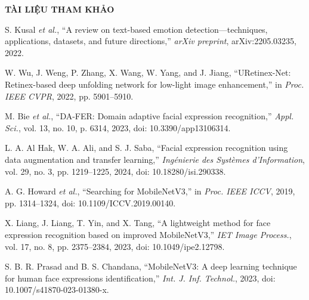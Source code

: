 {\LARGE \textbf{TÀI LIỆU THAM KHẢO}} \\[1cm] %

\begin{enumerate}[label={[{\arabic*}]}]
    \item S. Kusal \textit{et al.}, “A review on text-based emotion detection—techniques, applications, datasets, and future directions,” \textit{arXiv preprint}, arXiv:2205.03235, 2022.

    \item W. Wu, J. Weng, P. Zhang, X. Wang, W. Yang, and J. Jiang, “URetinex-Net: Retinex-based deep unfolding network for low-light image enhancement,” in \textit{Proc. IEEE CVPR}, 2022, pp. 5901–5910.

    \item M. Bie \textit{et al.}, “DA-FER: Domain adaptive facial expression recognition,” \textit{Appl. Sci.}, vol. 13, no. 10, p. 6314, 2023, doi: 10.3390/app13106314.

    \item L. A. Al Hak, W. A. Ali, and S. J. Saba, “Facial expression recognition using data augmentation and transfer learning,” \textit{Ingénierie des Systèmes d'Information}, vol. 29, no. 3, pp. 1219–1225, 2024, doi: 10.18280/isi.290338.

    \item A. G. Howard \textit{et al.}, “Searching for MobileNetV3,” in \textit{Proc. IEEE ICCV}, 2019, pp. 1314–1324, doi: 10.1109/ICCV.2019.00140.

    \item X. Liang, J. Liang, T. Yin, and X. Tang, “A lightweight method for face expression recognition based on improved MobileNetV3,” \textit{IET Image Process.}, vol. 17, no. 8, pp. 2375–2384, 2023, doi: 10.1049/ipe2.12798.

    \item S. B. R. Prasad and B. S. Chandana, “MobileNetV3: A deep learning technique for human face expressions identification,” \textit{Int. J. Inf. Technol.}, 2023, doi: 10.1007/s41870-023-01380-x.
\end{enumerate}